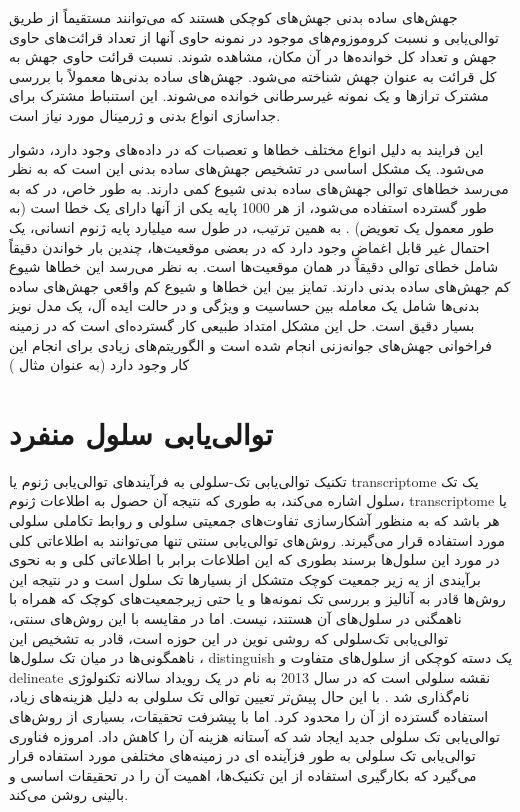 جهش‌های ساده بدنی جهش‌های کوچکی هستند که می‌توانند مستقیماً از طریق توالی‌یابی و نسبت کروموزوم‌های موجود در نمونه حاوی آنها از تعداد قرائت‌های حاوی جهش و تعداد کل خوانده‌ها در آن مکان، مشاهده شوند. نسبت قرائت حاوی جهش به کل قرائت به عنوان  جهش شناخته می‌شود. جهش‌های ساده بدنی‌ها معمولاً با بررسی مشترک ترازها و یک نمونه غیر‌سرطانی خوانده می‌شوند. این استنباط مشترک برای جداسازی انواع بدنی و ژرمینال مورد نیاز است.

این فرایند به دلیل انواع مختلف خطاها و تعصبات که در داده‌های  وجود دارد، دشوار می‌شود\cite{friedl2010plasticity}. یک مشکل اساسی در تشخیص جهش‌های ساده بدنی این است که به نظر می‌رسد خطاهای توالی جهش‌های ساده بدنی شیوع کمی دارند. به طور خاص، در    که به طور گسترده استفاده می‌شود، از هر 1000 پایه یکی از آنها دارای یک خطا است (به طور معمول یک تعویض) \cite{sabeh2009protease}. به همین ترتیب، در طول سه میلیارد پایه ژنوم انسانی، یک احتمال غیر قابل اغماض وجود دارد که در بعضی موقعیت‌ها، چندین بار خواندن دقیقاً شامل خطای توالی دقیقاً در همان موقعیت‌ها است. به نظر می‌رسد این خطاها شیوع کم جهش‌های ساده بدنی دارند. تمایز بین این خطاها و شیوع کم واقعی جهش‌های ساده بدنی‌ها شامل یک معامله بین حساسیت و ویژگی و در حالت ایده آل، یک مدل نویز بسیار دقیق است. حل این مشکل امتداد طبیعی کار گسترده‌ای است که در زمینه فراخوانی جهش‌های جوانه‌زنی انجام شده است و الگوریتم‌های زیادی برای انجام این کار وجود دارد (به عنوان مثال \cite{friedl2010plasticity, demicheli2008effects})

\section{توالی‌یابی سلول منفرد}

تکنیک توالی‌یابی تک-سلولی به فرآیندهای توالی‌یابی ژنوم یا \gls{transcriptome} یک تک سلول اشاره می‌کند، به طوری که نتیجه آن حصول به اطلاعات ژنوم، \gls{transcriptome} یا هر  باشد که به منظور آشکارسازی تفاوت‌های جمعیتی سلولی و روابط تکاملی سلولی مورد استفاده قرار می‌گیرند.
روش‌های توالی‌یابی سنتی تنها می‌توانند به اطلاعاتی کلی در مورد این سلول‌ها برسند بطوری که این اطلاعات برابر با اطلاعاتی کلی و به نحوی برآیندی از یه زیر جمعیت کوچک متشکل از بسیارها تک سلول است و در نتیجه این روش‌ها قادر به آنالیز و بررسی تک نمونه‌ها و یا حتی زیرجمعیت‌های کوچک که همراه با  ناهمگنی در سلول‌های آن هستند، نیست. اما در مقایسه با این روش‌های سنتی، توالی‌یابی تک‌سلولی که روشی نوین در این حوزه است، قادر به تشخیص این ناهمگونی‌ها در میان تک سلول‌ها \cite{wen2018boosting}، \gls{distinguish} یک دسته کوچکی از سلول‌های متفاوت و \gls{delineate} نقشه سلولی است که در سال 2013 به نام  در یک رویداد سالانه تکنولوژی نام‌گذاری شد \cite{pennisi2012single}. 
با این حال پیش‌تر تعیین توالی تک سلولی به دلیل هزینه‌های زیاد، استفاده گسترده از آن را محدود کرد. اما با پیشرفت تحقیقات، بسیاری از روش‌های توالی‌یابی تک سلولی جدید ایجاد شد که آستانه هزینه آن را کاهش داد. امروزه فناوری توالی‌یابی تک سلولی به طور فزآینده ای در زمینه‌های مختلفی مورد استفاده قرار می‌گیرد که بکارگیری استفاده از این تکنیک‌ها، اهمیت آن را در تحقیقات اساسی و بالینی روشن می‌کند. 

